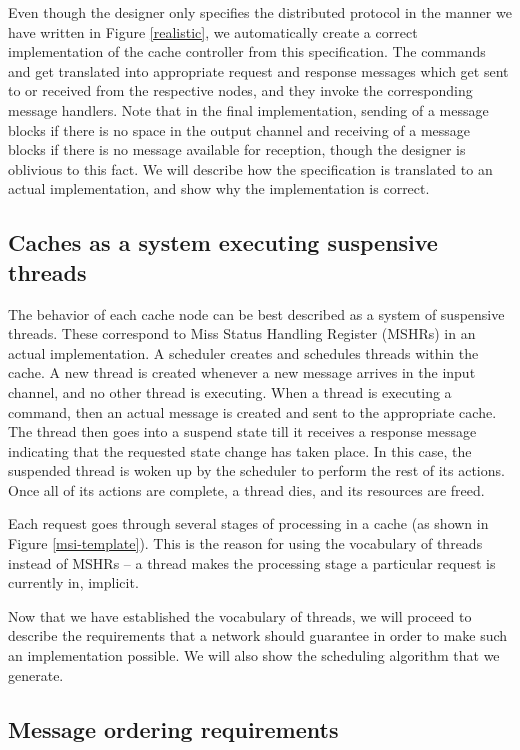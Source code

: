 Even though the designer only specifies the distributed protocol in the manner we have
written in Figure \ref{realistic}, we automatically
create a correct implementation of the cache controller from this
specification.  The commands \send{} and \receive{} get translated into
appropriate request and response messages which get sent to or received from the respective
nodes, and they invoke the corresponding message handlers. Note that in the final
implementation, sending of a message blocks if there is no space in the output
channel and receiving of a message blocks if there is no message available for
reception, though the designer is oblivious to this fact. We will describe how
the specification is translated to an actual implementation, and show why the
implementation is correct.

\subsection{Caches as a system executing suspensive threads}
The behavior of each cache node can be best described as a system of suspensive
threads. These correspond to Miss Status Handling Register (MSHRs) in an actual
implementation. A scheduler creates and schedules threads within the cache.  A
new thread is created whenever a new message arrives in the input channel, and
no other thread is executing. When a thread is executing a \send{} command, then
an actual message is created and sent to the appropriate cache. The thread then
goes into a suspend state till it receives a response message indicating that
the requested state change has taken place. In this case, the suspended thread is
woken up by the scheduler to perform the rest of its actions. Once all of its
actions are complete, a thread dies, and its resources are freed.

Each request goes through several stages of processing in a cache (as shown in
Figure \ref{msi-template}). This is the reason for using the vocabulary of
threads instead of MSHRs -- a thread makes the processing stage a particular
request is currently in, implicit.

Now that we have established the vocabulary of threads, we will proceed to
describe the requirements that a network should guarantee in order to make such
an implementation possible. We will also show the scheduling algorithm that we
generate.

\subsection{Message ordering requirements}

